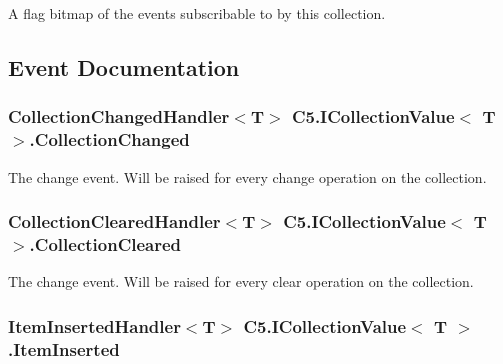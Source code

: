 A flag bitmap of the events subscribable to by this collection. 



\subsection{Event Documentation}
\hypertarget{interface_c5_1_1_i_collection_value_a50d218d2c7a194c1a641e14d167b7412}{}
\subsubsection[{Collection\+Changed}]{\setlength{\rightskip}{0pt plus 5cm}Collection\+Changed\+Handler$<$T$>$ {\bf C5.\+I\+Collection\+Value}$<$ T $>$.Collection\+Changed}\label{interface_c5_1_1_i_collection_value_a50d218d2c7a194c1a641e14d167b7412}


The change event. Will be raised for every change operation on the collection. 

\hypertarget{interface_c5_1_1_i_collection_value_abfc456208223df571826f444d368f851}{}
\subsubsection[{Collection\+Cleared}]{\setlength{\rightskip}{0pt plus 5cm}Collection\+Cleared\+Handler$<$T$>$ {\bf C5.\+I\+Collection\+Value}$<$ T $>$.Collection\+Cleared}\label{interface_c5_1_1_i_collection_value_abfc456208223df571826f444d368f851}


The change event. Will be raised for every clear operation on the collection. 

\hypertarget{interface_c5_1_1_i_collection_value_a2677a887fe66bbb35811797a04ba9a46}{}
\subsubsection[{Item\+Inserted}]{\setlength{\rightskip}{0pt plus 5cm}Item\+Inserted\+Handler$<$T$>$ {\bf C5.\+I\+Collection\+Value}$<$ T $>$.Item\+Inserted}\label{interface_c5_1_1_i_collection_value_a2677a887fe66bbb35811797a04ba9a46}


